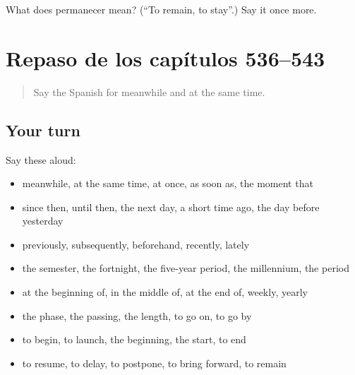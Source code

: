 \begin{tcolorbox}[breakable,colback=teal!4,colframe=teal!35!black,title={Before you move on}]
What does permanecer mean? (\textquotedblleft{}To remain, to stay\textquotedblright{}.) Say it once more.
\end{tcolorbox}
\section[(dialogue)]{Repaso de los capítulos 536–543}

\label{lesson:ES-R543-repaso-536-543}



\begin{quote}
Say the Spanish for meanwhile and at the same time.
\end{quote}

\subsection*{Your turn}
Say these aloud:

\begin{itemize}
\raggedright
  \item meanwhile, at the same time, at once, as soon as, the moment that
  \item since then, until then, the next day, a short time ago, the day before yesterday
  \item previously, subsequently, beforehand, recently, lately
  \item the semester, the fortnight, the five-year period, the millennium, the period
  \item at the beginning of, in the middle of, at the end of, weekly, yearly
  \item the phase, the passing, the length, to go on, to go by
  \item to begin, to launch, the beginning, the start, to end
  \item to resume, to delay, to postpone, to bring forward, to remain
\end{itemize}

